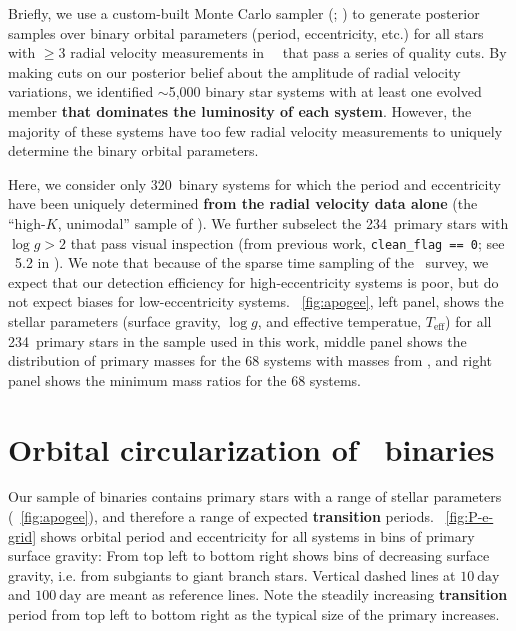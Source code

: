 \documentclass[modern, letterpaper]{aastex62}
\newcommand{\apogee}{\project{\acronym{APOGEE}}}
\newcommand{\DR}{\acronym{DR14}}
\newcommand{\logg}{\ensuremath{\log g}}
\newcommand{\nunimodal}{320}
\newcommand{\nclean}{234}
\renewcommand{\changes}[1]{\textbf{#1}}
\begin{document}
Briefly, we use a custom-built Monte Carlo sampler (;
\citealt{Price-Whelan:2017}) to generate posterior samples over binary orbital
parameters (period, eccentricity, etc.) for all stars with $\geq 3$ radial
velocity measurements in \apogee\ \DR\ that pass a series of quality cuts.
By making cuts on our posterior belief about the amplitude of radial velocity
variations, we identified $\sim$5,000 binary star systems with at least one
evolved member \changes{that dominates the luminosity of each system}.
However, the majority of these systems have too few radial velocity measurements
to uniquely determine the binary orbital parameters.

Here, we consider only \nunimodal\ binary systems for which the period and eccentricity have been uniquely determined \changes{from the radial velocity data alone} (the ``high-$K$, unimodal'' sample of \citealt{Price-Whelan:2018}).
We further subselect the \nclean\ primary stars with $\logg > 2$ that pass visual inspection (from previous work, \texttt{clean\_flag == 0}; see \sectionname~5.2 in \citealt{Price-Whelan:2018}).
We note that because of the sparse time sampling of the \apogee\ survey, we
expect that our detection efficiency for high-eccentricity systems is poor, but
do not expect biases for low-eccentricity systems.
\figurename~\ref{fig:apogee}, left panel, shows the stellar parameters (surface
gravity, $\log g$, and effective temperatue, $T_{\textrm{eff}}$) for all
\nclean\ primary stars in the sample used in this work, middle panel shows the
distribution of primary masses for the 68 systems with masses from
\cite{Ness:2016}, and right panel shows the minimum mass ratios for the 68
systems.


\section{Orbital circularization of \apogee\ binaries}
\label{sec:results}

Our sample of binaries contains primary stars with a range of stellar parameters
(\figurename~\ref{fig:apogee}), and therefore a range of expected
\changes{transition} periods.
\figurename~\ref{fig:P-e-grid} shows orbital period and eccentricity for all
systems in bins of primary surface gravity:
From top left to bottom right shows bins of decreasing surface gravity, i.e.
from subgiants to giant branch stars.
Vertical dashed lines at $10~\textrm{day}$ and $100~\textrm{day}$ are meant as
reference lines.
Note the steadily increasing \changes{transition} period from top left to bottom
right as the typical size of the primary increases.
\end{document}
